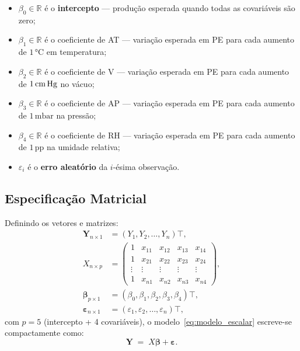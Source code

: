 \documentclass[12pt, a4paper]{article}
\newcommand{\T}{{\top}}
\newcommand{\mY}{\mathbf{Y}}
\newcommand{\mb}{\boldsymbol{\beta}}
\newcommand{\beps}{\boldsymbol{\varepsilon}}
\begin{document}
\begin{itemize}
  \item $\beta_0 \in \mathbb{R}$ é o \textbf{intercepto} --- produção esperada
        quando todas as covariáveis são zero;
  \item $\beta_1 \in \mathbb{R}$ é o coeficiente de AT --- variação esperada em
        PE para cada aumento de $1\,\text{°C}$ em temperatura;
  \item $\beta_2 \in \mathbb{R}$ é o coeficiente de V --- variação esperada em
        PE para cada aumento de $1\,\text{cm\,Hg}$ no vácuo;
  \item $\beta_3 \in \mathbb{R}$ é o coeficiente de AP --- variação esperada em
        PE para cada aumento de $1\,\text{mbar}$ na pressão;
  \item $\beta_4 \in \mathbb{R}$ é o coeficiente de RH --- variação esperada em
        PE para cada aumento de $1\,\text{pp}$ na umidade relativa;
  \item $\varepsilon_i$ é o \textbf{erro aleatório} da $i$-ésima observação.
\end{itemize}
 
\subsection*{Especificação Matricial}
 
Definindo os vetores e matrizes:
\begin{align*}
  \mY_{n \times 1}   &= (Y_1, Y_2, \ldots, Y_n)\T, \\[4pt]
  X_{n \times p}     &= \begin{pmatrix}
                          1 & x_{11} & x_{12} & x_{13} & x_{14} \\
                          1 & x_{21} & x_{22} & x_{23} & x_{24} \\
                          \vdots & \vdots & \vdots & \vdots & \vdots \\
                          1 & x_{n1} & x_{n2} & x_{n3} & x_{n4}
                        \end{pmatrix}, \\[4pt]
  \mb_{p \times 1}   &= (\beta_0, \beta_1, \beta_2, \beta_3, \beta_4)\T, \\[4pt]
  \beps_{n \times 1} &= (\varepsilon_1, \varepsilon_2, \ldots, \varepsilon_n)\T,
\end{align*}
com $p = 5$ (intercepto + 4 covariáveis), o modelo~\eqref{eq:modelo_escalar}
escreve-se compactamente como:
\begin{equation}
  \mY \;=\; X\mb + \beps.
  \label{eq:modelo_matricial}
\end{equation}
 
\end{document}

